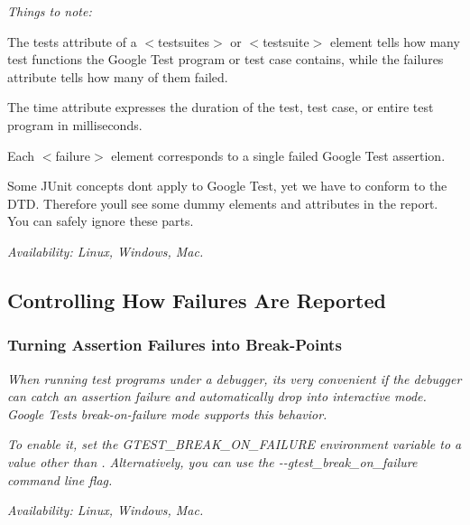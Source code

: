 {\itshape Things to note\+:}

{\itshape 
\begin{DoxyItemize}
\item The {\ttfamily tests} attribute of a {\ttfamily $<$testsuites$>$} or {\ttfamily $<$testsuite$>$} element tells how many test functions the Google Test program or test case contains, while the {\ttfamily failures} attribute tells how many of them failed.
\item The {\ttfamily time} attribute expresses the duration of the test, test case, or entire test program in milliseconds.
\item Each {\ttfamily $<$failure$>$} element corresponds to a single failed Google Test assertion.
\item Some J\+Unit concepts don\textquotesingle{}t apply to Google Test, yet we have to conform to the D\+TD. Therefore you\textquotesingle{}ll see some dummy elements and attributes in the report. You can safely ignore these parts.
\end{DoxyItemize}}

{\itshape {\itshape Availability\+:} Linux, Windows, Mac.}

{\itshape \subsection*{Controlling How Failures Are Reported}}

{\itshape }

{\itshape \subsubsection*{Turning Assertion Failures into Break-\/\+Points}}

{\itshape }

{\itshape When running test programs under a debugger, it\textquotesingle{}s very convenient if the debugger can catch an assertion failure and automatically drop into interactive mode. Google Test\textquotesingle{}s {\itshape break-\/on-\/failure} mode supports this behavior.}

{\itshape To enable it, set the {\ttfamily G\+T\+E\+S\+T\+\_\+\+B\+R\+E\+A\+K\+\_\+\+O\+N\+\_\+\+F\+A\+I\+L\+U\+RE} environment variable to a value other than {} . Alternatively, you can use the {\ttfamily -\/-\/gtest\+\_\+break\+\_\+on\+\_\+failure} command line flag.}

{\itshape {\itshape Availability\+:} Linux, Windows, Mac.}

